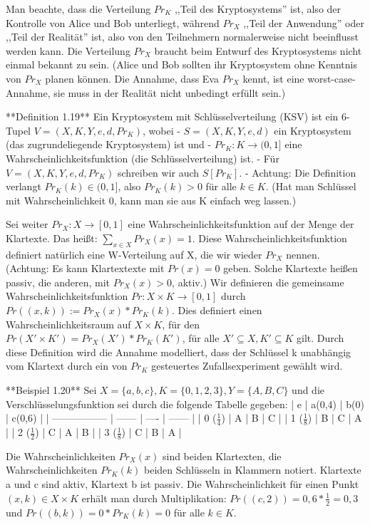 \documentclass[a4paper]{article}
\begin{document}
\begin{multicols}{3}
        Man beachte, dass die Verteilung $Pr_K$ ,,Teil des Kryptosystems'' ist, also der Kontrolle von Alice und Bob unterliegt, während $Pr_X$ ,,Teil der Anwendung'' oder ,,Teil der Realität'' ist, also von den Teilnehmern normalerweise nicht beeinflusst werden kann. Die Verteilung $Pr_X$ braucht beim Entwurf des Kryptosystems nicht einmal bekannt zu sein. (Alice und Bob sollten ihr Kryptosystem ohne Kenntnis von $Pr_X$ planen können. Die Annahme, dass Eva $Pr_X$ kennt, ist eine worst-case-Annahme, sie muss in der Realität nicht unbedingt erfüllt sein.)

        **Definition 1.19** Ein Kryptosystem mit Schlüsselverteilung (KSV) ist ein 6-Tupel $V=(X,K,Y,e,d,Pr_K)$, wobei
        - $S=(X,K,Y,e,d)$ ein Kryptosystem (das zugrundeliegende Kryptosystem) ist und
        - $Pr_K:K\rightarrow (0,1]$ eine Wahrscheinlichkeitsfunktion (die Schlüsselverteilung) ist.
        - Für $V=(X,K,Y,e,d,Pr_K)$ schreiben wir auch $S[Pr_K]$.
        - Achtung: Die Definition verlangt $Pr_K(k)\in (0,1]$, also $Pr_K(k)> 0$ für alle $k\in K$. (Hat man Schlüssel mit Wahrscheinlichkeit 0, kann man sie aus K einfach weg lassen.)

        Sei weiter $Pr_X:X\rightarrow [0,1]$ eine Wahrscheinlichkeitsfunktion auf der Menge der Klartexte. Das heißt: $\sum_{x\in X}Pr_X(x)=1$. Diese Wahrscheinlichkeitsfunktion definiert natürlich eine W-Verteilung auf X, die wir wieder $Pr_X$ nennen. (Achtung: Es kann Klartextexte mit $Pr(x)=0$ geben. Solche Klartexte heißen passiv, die anderen, mit $Pr_X(x)>0$, aktiv.) Wir definieren die gemeinsame Wahrscheinlichkeitsfunktion $Pr:X\times K\rightarrow [0,1]$ durch $Pr((x,k)):=Pr_X(x)*Pr_K(k)$.
        Dies definiert einen Wahrscheinlichkeitsraum auf $X\times K$, für den $Pr(X′\times K′)=Pr_X(X′)*Pr_K(K′)$, für alle $X′\subseteq X,K′\subseteq K$ gilt. Durch diese Definition wird die Annahme modelliert, dass der Schlüssel k unabhängig vom Klartext durch ein von $Pr_K$ gesteuertes Zufallsexperiment gewählt wird.

        **Beispiel 1.20** Sei $X=\{a,b,c\},K=\{0,1,2,3\},Y=\{A,B,C\}$ und die Verschlüsselungsfunktion sei durch die folgende Tabelle gegeben:
        | e                 | a(0,4) | b(0) | c(0,6) |
        | ----------------- | ------ | ---- | ------ |
        | 0 ($\frac{1}{4}$) | A      | B    | C      |
        | 1 ($\frac{1}{8}$) | B      | C    | A      |
        | 2 ($\frac{1}{2}$) | C      | A    | B      |
        | 3 ($\frac{1}{8}$) | C      | B    | A      |

        Die Wahrscheinlichkeiten $Pr_X(x)$ sind beiden Klartexten, die Wahrscheinlichkeiten $Pr_K(k)$ beiden Schlüsseln in Klammern notiert. Klartexte a und c sind aktiv, Klartext b ist passiv. Die Wahrscheinlichkeit für einen Punkt $(x,k)\in X\times K$ erhält man durch Multiplikation: $Pr((c,2)) = 0,6 *\frac{1}{2}=0,3$ und $Pr((b,k))=0*Pr_K(k)=0$ für alle $k\in K$.


\end{multicols}
\end{document}
